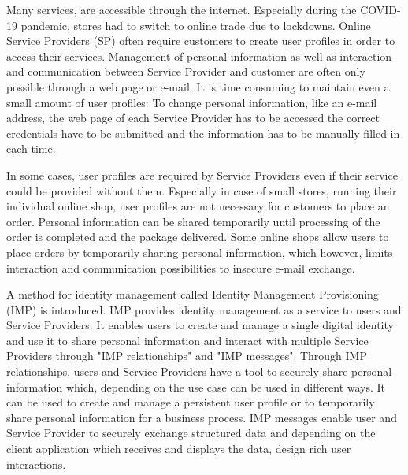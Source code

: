 Many services, are accessible through the internet. Especially during the COVID-19 pandemic, stores had to switch to online trade due to lockdowns. Online Service Providers (SP) often require customers to create user profiles in order to access their services. Management of personal information as well as interaction and communication between Service Provider and customer are often only possible through a web page or e-mail. It is time consuming to maintain even a small amount of user profiles: To change personal information, like an e-mail address, the web page of each Service Provider has to be accessed the correct credentials have to be submitted and the information has to be manually filled in each time.

In some cases, user profiles are required by Service Providers even if their service could be provided without them. Especially in case of small stores, running their individual online shop, user profiles are not necessary for customers to place an order. Personal information can be shared temporarily until processing of the order is completed and the package delivered. Some online shops allow users to place orders by temporarily sharing personal information, which however, limits interaction and communication possibilities to insecure e-mail exchange.

A method for identity management called Identity Management Provisioning (IMP) is introduced. IMP provides identity management as a service to users and Service Providers. It enables users to create and manage a single digital identity and use it to share personal information and interact with multiple Service Providers through "IMP relationships" and "IMP messages". Through IMP relationships, users and Service Providers have a tool to securely share personal information which, depending on the use case can be used in different ways. It can be used to create and manage a persistent user profile or to temporarily share personal information for a business process. IMP messages enable user and Service Provider to securely exchange structured data and depending on the client application which receives and displays the data, design rich user interactions.